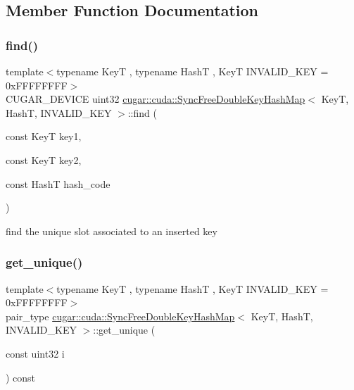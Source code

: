 \subsection{Member Function Documentation}
\mbox{\label{structcugar_1_1cuda_1_1_sync_free_double_key_hash_map_a279f94f0e11b195b974a74cf1b1c84ba}} 
\subsubsection{\texorpdfstring{find()}{find()}}
{\footnotesize\ttfamily template$<$typename KeyT , typename HashT , KeyT I\+N\+V\+A\+L\+I\+D\+\_\+\+K\+EY = 0x\+F\+F\+F\+F\+F\+F\+FF$>$ \\
C\+U\+G\+A\+R\+\_\+\+D\+E\+V\+I\+CE uint32 \hyperlink{structcugar_1_1cuda_1_1_sync_free_double_key_hash_map}{cugar\+::cuda\+::\+Sync\+Free\+Double\+Key\+Hash\+Map}$<$ KeyT, HashT, I\+N\+V\+A\+L\+I\+D\+\_\+\+K\+EY $>$\+::find (\begin{DoxyParamCaption}\item[{const KeyT}]{key1,  }\item[{const KeyT}]{key2,  }\item[{const HashT}]{hash\+\_\+code }\end{DoxyParamCaption})\hspace{0.3cm}{\ttfamily [inline]}}

find the unique slot associated to an inserted key \mbox{\label{structcugar_1_1cuda_1_1_sync_free_double_key_hash_map_a185a0df23df4a664e8d6f0582b8db16c}} 
\subsubsection{\texorpdfstring{get\+\_\+unique()}{get\_unique()}}
{\footnotesize\ttfamily template$<$typename KeyT , typename HashT , KeyT I\+N\+V\+A\+L\+I\+D\+\_\+\+K\+EY = 0x\+F\+F\+F\+F\+F\+F\+FF$>$ \\
pair\+\_\+type \hyperlink{structcugar_1_1cuda_1_1_sync_free_double_key_hash_map}{cugar\+::cuda\+::\+Sync\+Free\+Double\+Key\+Hash\+Map}$<$ KeyT, HashT, I\+N\+V\+A\+L\+I\+D\+\_\+\+K\+EY $>$\+::get\+\_\+unique (\begin{DoxyParamCaption}\item[{const uint32}]{i }\end{DoxyParamCaption}) const\hspace{0.3cm}{\ttfamily [inline]}}

